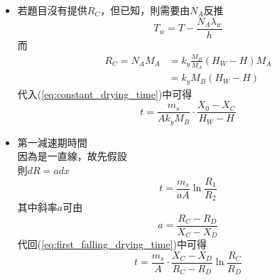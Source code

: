 \documentclass[../main.tex]{subfiles}
\begin{document}
\begin{itemize}
\begin{itemize}
\begin{equation}
      N_A = \text{對流質傳} = k_y\Delta y_A = k_y (y_W -y)
    \end{equation}
    因為
    \begin{equation}
      y = \frac{n_A}{n_A + n_B}  = \frac{m_A/M_A}{m_A/M_A + m_B/M_B}
    \end{equation}
    而由濕度$H$的定義可得
    \begin{equation}
      y = \frac{\frac{H}{M_A}}{\frac{H}{M_A} + \frac{1}{M_B}} 
    \end{equation}
    而當$H\ll 1$時
    \begin{equation}
      \frac{H}{M_A} + \frac{1}{M_B} \implies 
      \frac{H}{M_A} \ll \frac{1}{M_B}
    \end{equation}
    代入$y$中可得
    \begin{equation}
      y \approx \frac{M}{M_A} \cdot H 
    \end{equation}
    代入(\ref{eq:drying_rate})中可得
    \begin{equation}
      N_A = k_y \frac{M_B}{M_A}(H_W - H)
    \end{equation}
    \item 若題目沒有提供$R_C$，但已知，則需要由$N_A$反推
    \begin{equation}
      T_w = T - \frac{N_A \lambda_w}{h}
    \end{equation}
    而
    \begin{align}
      R_C = N_A M_A &= k_y \frac{M_B}{M_A}(H_W - H) M_A \nonumber \\
      &= \boxed{k_y M_B (H_W - H)}
    \end{align}
    代入(\ref{eq:constant_drying_time})中可得
    \begin{equation}
      \boxed{t = \frac{m_s}{A k_y M_B}\cdot \frac{X_0 - X_C}{H_W - H}}
    \end{equation}
    \item 第一減速期時間\\
    因為是一直線，故先假設\\
    則$dR = adx$
    \begin{equation}
      t = \frac{m_s}{aA} \ln \frac{R_1}{R_2} \label{eq:first_falling_drying_time}
    \end{equation}
    其中斜率$a$可由
    \begin{equation}
      a = \frac{R_C - R_D}{X_C - X_D}
    \end{equation}
    代回(\ref{eq:first_falling_drying_time})中可得
    \begin{equation}
      \boxed{t = \frac{m_s}{A} \cdot \frac{X_C - X_D}{R_C - R_D} \ln \frac{R_C}{R_D}}

\end{equation}
\end{itemize}
\end{itemize}
\end{document}

